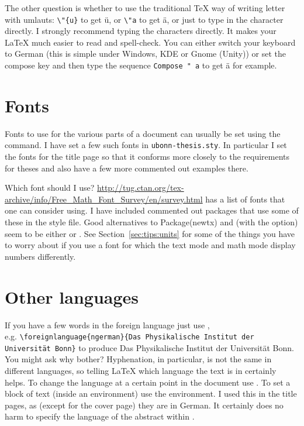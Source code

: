 The other question is whether to use the traditional \TeX{} way of
writing letter with umlauts: \verb+\"{u}+ to get \"{u}, or \verb+\"a+
to get \"a, or just to type in the character directly. I strongly
recommend typing the characters directly. It makes your \LaTeX{} much
easier to read and spell-check. You can either switch your keyboard to
German (this is simple under Windows, KDE or Gnome (Unity)) or set the
compose key and then type the sequence \texttt{Compose " a} to get ä
for example.


\section{Fonts}
\label{sec:layout:font}

Fonts to use for the various parts of a
document can usually be set using the  command. I
have set a few such fonts in \texttt{ubonn-thesis.sty}. In particular
I set the fonts for the title page so that it conforms more closely to
the requirements for theses and also have a few more commented out
examples there.

Which font should I use?
\url{http://tug.ctan.org/tex-archive/info/Free_Math_Font_Survey/en/survey.html}
has a list of fonts that one can consider using. I have included
commented out packages that use some of these in the style file. Good
alternatives to Package(newtx) and  (with the  option) seem
to be either  or . See
Section~\ref{sec:tips:units} for some of the things you have to worry
about if you use a font for which the text mode and math mode display
numbers differently.


\section{Other languages}
\label{sec:layout:lang}

If you have a few words in the foreign language just use
,\\
e.g. \texttt{\textbackslash foreignlanguage\{ngerman\}\{Das
  Physikalische Institut der Universität Bonn\}}  to produce \foreignlanguage{ngerman}{Das
  Physikalische Institut der Universität Bonn}. You might ask why
bother? Hyphenation, in particular, is not the same in different
languages, so telling \LaTeX{} which language the text is in certainly
helps. To change the language at a certain point in the document use
. To set a block of text (inside an environment)
use the  environment. I used this in the title
pages, as (except for the cover page) they are in German. It certainly
does no harm to specify the language of the abstract
within .

